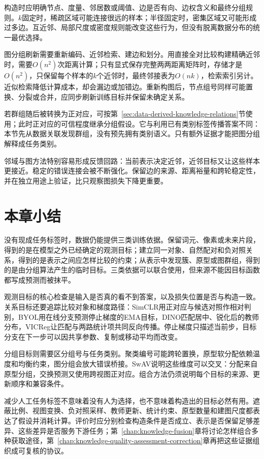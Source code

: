 构造时应明确节点、度量、邻居数或阈值、边是否有向、边权含义和最终分组规则。$k$固定时，稀疏区域可能连接很远的样本；半径固定时，密集区域又可能形成过多边。互近邻、局部尺度或密度规则能改变这些行为，但没有脱离数据分布的统一最优选择。

图分组刷新需要重新编码、近邻检索、建边和划分。用直接全对比较构建精确近邻时，需要$O(n^2)$次距离计算；只有显式保存完整两两距离矩阵时，存储才是$O(n^2)$，只保留每个样本的$k$个近邻时，最终邻接表为$O(nk)$，检索索引另计。近似检索降低计算成本，却会漏边或加错边。重新构图后，节点组号同样可能置换、分裂或合并，应同步刷新训练目标并保留未确定关系。

若群组随后被转换为正对应，可按第~\ref{sec:data-derived-knowledge-relations}节使用；此时正对应的可信程度继承分组假设。它与利用已有类别标签传播答案不同：本节先从数据关联发现群组，没有预先拥有类别语义。只有额外证据才能把图分组解释成任务类别。

邻域与图方法特别容易形成反馈回路：当前表示决定近邻，近邻目标又让这些样本更接近。稳定的错误连接会被不断强化。保留边的来源、距离裕量和跨轮稳定性，并在独立用途上验证，比只观察图损失下降更重要。

\section{本章小结}
\label{sec:data-derived-knowledge-summary}

没有现成任务标签时，数据仍能提供三类训练依据。保留词元、像素或未来片段，得到的是在模型之外已经确定的观测目标；建立同一对象、自然配对和负对照关系，得到的是表示之间应怎样比较的约束；从表示中发现簇、原型或图群组，得到的是由分组算法产生的临时目标。三类依据可以联合使用，但来源不能因目标函数都写成预测而被抹平。

观测目标的核心检查是输入是否真的看不到答案，以及损失位置是否与构造一致。关系目标还要追踪比较对象和梯度路径：SimCLR用正对应与候选对照作相对判别，BYOL用在线分支预测停止梯度的EMA目标，DINO匹配居中、锐化后的教师分布，VICReg让匹配与两路统计项共同反向传播。停止梯度只描述当前步，目标分支在下一步可以因共享参数、复制或移动平均而改变。

分组目标则需要区分组号与任务类别。聚类编号可能跨轮置换，原型软分配依赖温度和均衡约束，图分组会放大错误桥接。SwAV说明这些维度可以交叉：分配来自原型分组，交换预测又使用跨视图正对应。组合方法仍须说明每个目标的来源、更新顺序和兼容条件。

减少人工任务标签不意味着没有人为选择，也不意味着构造出的目标必然有用。遮蔽比例、视图变换、负对照采样、教师更新、统计约束、原型数量和建图尺度都表达了假设并消耗计算。评价时应分别检查构造条件是否成立、表示是否保留足够差异、这些差异是否服务下游任务；第~\ref{chap:knowledge-fusion}章将讨论怎样组合多种获取途径，第~\ref{chap:knowledge-quality-assessment-correction}章再把这些证据组织成可复核的协议。

